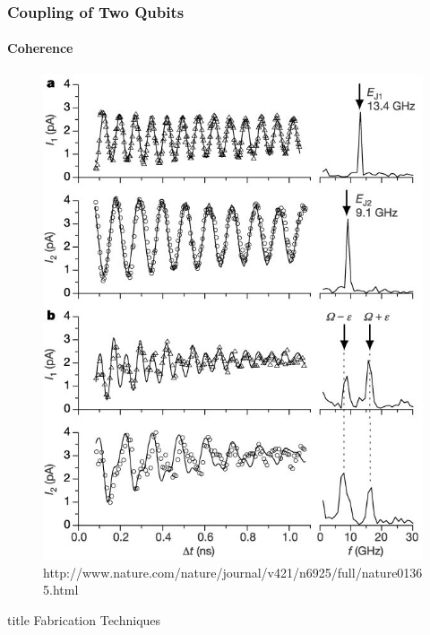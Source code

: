\documentclass{beamer}
\begin{document}
\begin{frame}
    \frametitle{Coupling of Two Qubits}
    \framesubtitle{Coherence}
    \begin{figure}[ht!]
        \centering
        \includegraphics[height=0.6\textheight]{img/probe-current-osc.jpg}
        \caption{http://www.nature.com/nature/journal/v421/n6925/full/nature01365.html}
    \end{figure}
\end{frame}


\begin{frame}
    \vfill
    \centering
    \begin{beamercolorbox}[sep=8pt,center,shadow=true,rounded=true]{title}
        Fabrication Techniques
    \end{beamercolorbox}
    \vfill
\end{frame}
\end{document}
